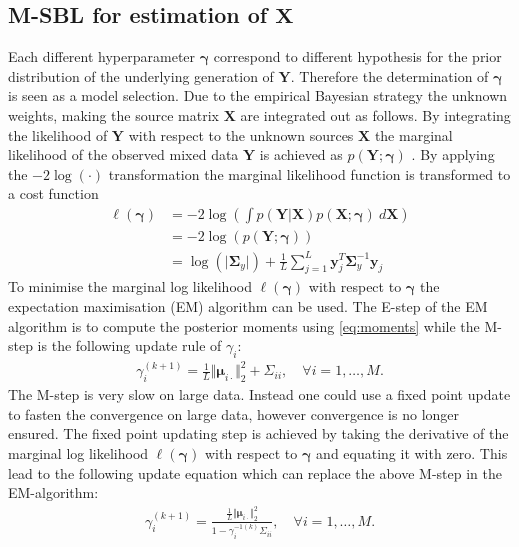 \subsection*{M-SBL for estimation of $\textbf{X}$}
Each different hyperparameter $\boldsymbol{\gamma}$ correspond to different hypothesis for the prior distribution of the underlying generation of $\mathbf{Y}$. Therefore the determination of $\boldsymbol{\gamma}$ is seen as a model selection.
Due to the empirical Bayesian strategy the unknown weights, making the source matrix $\textbf{X}$ are integrated out as follows.
By integrating the likelihood of $\textbf{Y}$ with respect to the unknown sources $\mathbf{X}$ the marginal likelihood of the observed mixed data $\mathbf{Y}$ is achieved as $p (\mathbf{Y} ; \boldsymbol{\gamma})$ \cite[p. 146]{phd_wipf}. 
By applying the $-2 \log (\cdot)$ transformation the marginal likelihood function is transformed to a cost function
\begin{align*}
\ell(\boldsymbol{\gamma}) &= -2 \log \left( \int p (\mathbf{Y}  \vert \mathbf{X}) p (\mathbf{X} ; \boldsymbol{\gamma}) \ d\mathbf{X} \right) \\
&= - 2 \log(p (\mathbf{Y} ; \boldsymbol{\gamma}))\\
&= \log ( \vert \boldsymbol{\Sigma}_y \vert) + \frac{1}{L} \sum_{j=1}^L \mathbf{y}_{j}^T \boldsymbol{\Sigma}_y ^{-1} \mathbf{y}_{j}
\end{align*}
To minimise the marginal log likelihood $\ell(\boldsymbol{\gamma})$ with respect to $\boldsymbol{\gamma}$ the expectation maximisation (EM)  algorithm can be used. 
The E-step of the EM algorithm is to compute the posterior moments using \eqref{eq:moments} while the M-step is the following update rule of $\gamma_i$:
\begin{align*}
\gamma_i^{(k+1)} = \frac{1}{L} \Vert \boldsymbol{\mu}_{i \cdot} \Vert_2^2 + \Sigma_{ii}, \quad \forall i = 1, \dots, M.
\end{align*}
The M-step is very slow on large data. 
Instead one could use a fixed point update to fasten the convergence on large data, however convergence is no longer ensured. 
The fixed point updating step is achieved by taking the derivative of the marginal log likelihood $\ell(\boldsymbol{\gamma})$ with respect to $\boldsymbol{\gamma}$ and equating it with zero. 
This lead to the following update equation which can replace the above M-step in the EM-algorithm:
\begin{align*}
\gamma_i^{(k+1)} = \frac{\frac{1}{L} \Vert \boldsymbol{\mu}_{i \cdot} \Vert_2^2}{1 - \gamma_i^{-1 (k)} \Sigma_{ii}}, \quad \forall i = 1, \dots, M.
\end{align*}

